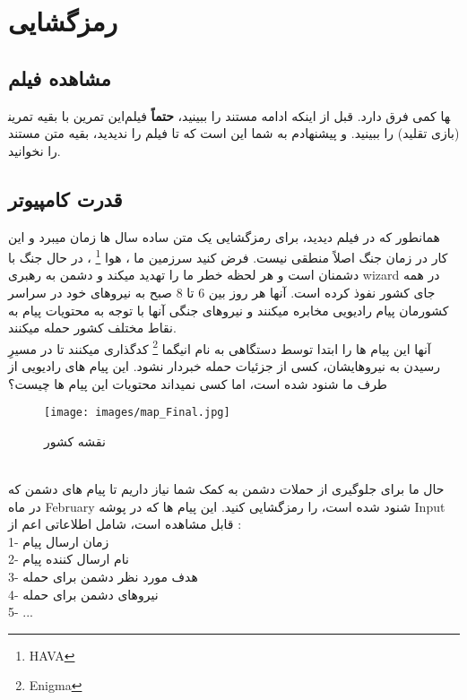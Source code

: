  \section{
        رمزگشایی
    }
    \subsection{مشاهده فیلم}
    \RTL
    این تمرین با بقیه تمرین‎ها کمی فرق دارد. قبل از اینکه ادامه مستند را ببینید، 
    \textbf{حتماً}
    فیلم 
    \grayBox{\textcolor{blue}{The Imitation Game}}
    \RTL
    (بازی تقلید) را ببینید.
    و پیشنهادم به شما این است که تا فیلم را ندیدید، بقیه متن مستند را نخوانید.
    \\
    \subsection{قدرت کامپیوتر}
    همانطور که در فیلم دیدید، برای رمزگشایی یک متن ساده سال ها زمان میبرد و این کار در زمان جنگ اصلاً منطقی نیست.
    فرض کنید سرزمین ما ، هوا
    \footnote{HAVA}
    ، در حال جنگ با دشمنان است
    و هر لحظه خطر ما را تهدید میکند و دشمن به رهبری wizard در همه جای کشور نفوذ کرده است.
    آنها هر روز بین 6 تا 8 صبح به نیروهای خود در سراسر کشورمان پیام رادیویی مخابره میکنند و نیروهای جنگی آنها با توجه به محتویات پیام به نقاط مختلف کشور حمله میکنند.
    \\
    آنها این پیام ها را ابتدا توسط دستگاهی به نام انیگما
    \footnote{Enigma}
    کدگذاری میکنند تا در مسیرِ رسیدن به نیروهایشان، کسی از جزئیات
    حمله خبردار نشود.
    این پیام های رادیویی از طرف ما شنود شده است، اما کسی نمیداند محتویات این پیام ها چیست؟
    \\
     \begin{figure}[h!]
        \centering
        \texttt{[image: images/map\_Final.jpg]}
        \caption{نقشه کشور}
        \label{fig:merge}
    \end{figure}\\
    حال ما برای جلوگیری از حملات دشمن به کمک شما نیاز داریم تا پیام های دشمن که در ماه February شنود شده است، را رمزگشایی کنید.
    این پیام ها که در پوشه Input
    قابل مشاهده است، شامل اطلاعاتی اعم از :
    \\
    1- زمان ارسال پیام
    \\
    2- نام ارسال کننده پیام
    \\
    3- هدف مورد نظر دشمن برای حمله
    \\
    4- نیروهای دشمن برای حمله
    \\
    5- ...
    \\
